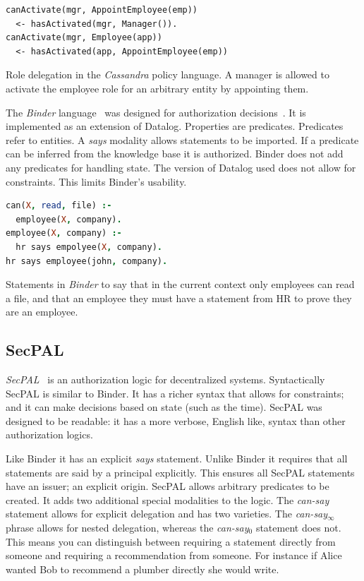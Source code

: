 \documentclass[a4paper]{article}
\begin{document}
\begin{marginfigure}
  \begin{lstlisting}[language=Cassandra]
canActivate(mgr, AppointEmployee(emp))
  <- hasActivated(mgr, Manager()).
canActivate(mgr, Employee(app))
  <- hasActivated(app, AppointEmployee(emp))
  \end{lstlisting}
  \caption{Role delegation in the \emph{Cassandra} policy language. A manager is
  allowed to activate the employee role for an arbitrary entity by appointing
  them.}
\label{code:cassandra}
\end{marginfigure}

The \emph{Binder} language~\cite{DeTreville:2002ff} was designed for
authorization decisions~\cite{Abadi:2003kt}.  It is implemented as an extension
of Datalog.  Properties are predicates. Predicates refer to entities.  A
\emph{says} modality allows statements to be imported.  If a predicate can be
inferred from the knowledge base it is authorized.  Binder does not add any
predicates for handling state.  The version of Datalog used does not allow for
constraints.  This limits Binder's usability.

\begin{marginfigure}
  \begin{lstlisting}[language=Prolog,morekeywords={*,says,:-}]
can(X, read, file) :- 
  employee(X, company).
employee(X, company) :- 
  hr says empolyee(X, company).
hr says employee(john, company).
  \end{lstlisting}
  \caption{Statements in \emph{Binder} to say that in the current context only
    employees can read a file, and that an employee they must have a statement
    from HR to prove they are an employee.}
\label{code:binder}
\end{marginfigure}


\subsection{SecPAL}

\emph{{SecPAL}}~\cite{Becker:2006vh} is an authorization logic for decentralized
systems. Syntactically {SecPAL} is similar to Binder. It has a richer syntax
that allows for constraints; and it can make decisions based on state (such as the
time). {SecPAL} was designed to be readable: it has a more verbose, English like,
syntax than other authorization logics.

Like Binder it has an explicit \emph{says} statement. Unlike Binder it requires
that all statements are said by a principal explicitly. This ensures all SecPAL
statements have an issuer; an explicit origin. {SecPAL} allows arbitrary
predicates to be created. It adds two additional special modalities to the
logic. The \emph{can-say} statement allows for explicit delegation and has two
varieties.  The \emph{can-say$_\infty$} phrase allows for nested delegation,
whereas the \emph{can-say$_0$} statement does not.  This means you can
distinguish between requiring a statement directly from someone and requiring a
recommendation from someone.  For instance if Alice wanted Bob to recommend a
plumber directly she would write.
\end{document}
